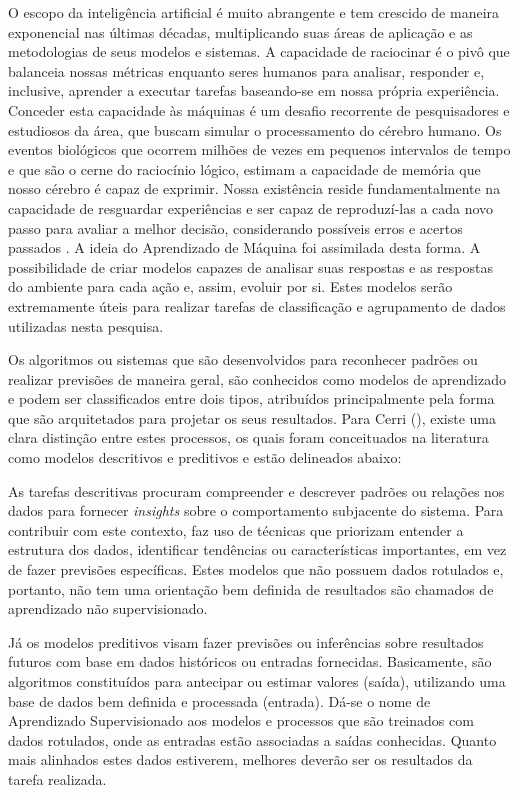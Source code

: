 O escopo da inteligência artificial é muito abrangente e tem crescido de maneira exponencial nas últimas décadas, multiplicando suas áreas de aplicação e as metodologias de seus modelos e sistemas. A capacidade de raciocinar é o pivô que balanceia nossas métricas enquanto seres humanos para analisar, responder e, inclusive, aprender a executar tarefas baseando-se em nossa própria experiência. Conceder esta capacidade às máquinas é um desafio recorrente de pesquisadores e estudiosos da área, que buscam simular o processamento do cérebro humano. Os eventos biológicos que ocorrem milhões de vezes em pequenos intervalos de tempo e que são o cerne do raciocínio lógico, estimam a capacidade de memória que nosso cérebro é capaz de exprimir. Nossa existência reside fundamentalmente na capacidade de resguardar experiências e ser capaz de reproduzí-las a cada novo passo para avaliar a melhor decisão, considerando possíveis erros e acertos passados \cite{cerri17}. A ideia do Aprendizado de Máquina foi assimilada desta forma. A possibilidade de criar modelos capazes de analisar suas respostas e as respostas do ambiente para cada ação e, assim, evoluir por si. Estes modelos serão extremamente úteis para realizar tarefas de classificação e agrupamento de dados utilizadas nesta pesquisa.

Os algoritmos ou sistemas que são desenvolvidos para reconhecer padrões ou realizar previsões de maneira geral, são conhecidos como modelos de aprendizado e podem ser classificados entre dois tipos, atribuídos principalmente pela forma que são arquitetados para projetar os seus resultados. Para Cerri (\citeyear{cerri17}), existe uma clara distinção entre estes processos, os quais foram conceituados na literatura como modelos descritivos e preditivos e estão delineados abaixo:

As tarefas descritivas procuram compreender e descrever padrões ou relações nos dados para fornecer \textit{insights} sobre o comportamento subjacente do sistema. Para contribuir com este contexto, faz uso de técnicas que priorizam entender a estrutura dos dados, identificar tendências ou características importantes, em vez de fazer previsões específicas. Estes modelos que não possuem dados rotulados e, portanto, não tem uma orientação bem definida de resultados são chamados de aprendizado não supervisionado.

Já os modelos preditivos visam fazer previsões ou inferências sobre resultados futuros com base em dados históricos ou entradas fornecidas. Basicamente, são algoritmos constituídos para antecipar ou estimar valores (saída), utilizando uma base de dados bem definida e processada (entrada). Dá-se o nome de Aprendizado Supervisionado aos modelos e processos que são treinados com dados rotulados, onde as entradas estão associadas a saídas conhecidas. Quanto mais alinhados estes dados estiverem, melhores deverão ser os resultados da tarefa realizada.


